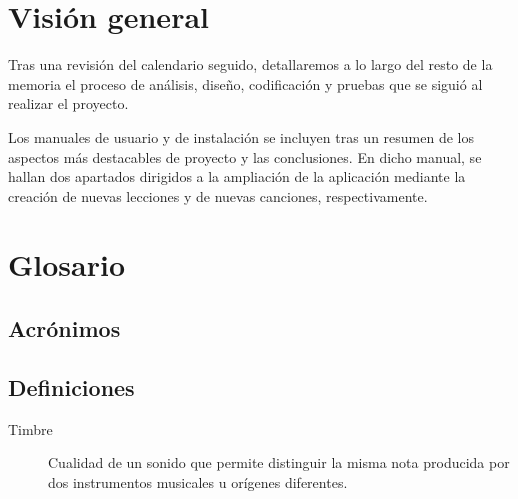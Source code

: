 \section{Visión general}

Tras una revisión del calendario seguido, detallaremos a lo largo del
resto de la memoria el proceso de análisis, diseño, codificación y
pruebas que se siguió al realizar el proyecto.  

Los manuales de usuario y de instalación se incluyen tras un resumen
de los aspectos más destacables de proyecto y las conclusiones. En
dicho manual, se hallan dos apartados dirigidos a la ampliación de la
aplicación mediante la creación de nuevas lecciones y de nuevas
canciones, respectivamente.

\section{Glosario}

\subsection{Acrónimos}



\subsection{Definiciones}
\begin{description}
\item[Timbre] Cualidad de un sonido que permite distinguir la misma
  nota producida por dos instrumentos musicales u orígenes diferentes.

\end{description}